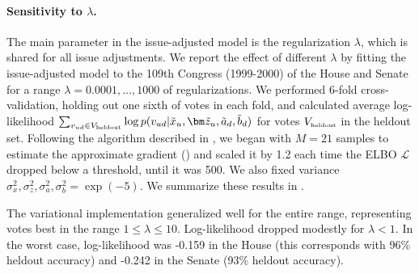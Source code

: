 \label{sec:performance}
\paragraph{Sensitivity to $\lambda$.}
The main parameter in the issue-adjusted model is the regularization
$\lambda$, which is shared for all issue adjustments. We report the
effect of different $\lambda$ by fitting the issue-adjusted model to
the 109th Congress (1999-2000) of the House and Senate for a range
$\lambda=0.0001, \ldots, 1000$ of regularizations.  We performed
$6$-fold cross-validation, holding out one sixth of votes in each
fold, and calculated average log-likelihood $\sum_{v_{ud} \in
  V_{\mbox{\tiny heldout}}} \log p(v_{ud} | \tilde x_u, \bm \tilde
z_u, \tilde a_d, \tilde b_d)$ for votes $V_{\mbox{\tiny heldout}}$ in
the heldout set. Following the algorithm described in
, we began with $M=21$ samples to estimate the
approximate gradient () and scaled it by
1.2 each time the ELBO $\mathcal{L}$ dropped below a threshold, until
it was 500. We also fixed variance $\sigma_x^2, \sigma_z^2,
\sigma_a^2, \sigma_b^2=\exp({-}5)$.  We summarize these results in
.

The variational implementation generalized well for the entire range,
representing votes best in the range $1 \le \lambda \le 10$.
Log-likelihood dropped modestly for $\lambda < 1$.  In the worst case,
log-likelihood was -0.159 in the House (this corresponds with 96\%
heldout accuracy) and -0.242 in the Senate (93\% heldout accuracy).

